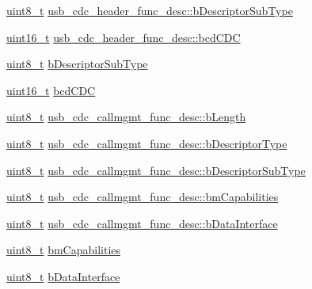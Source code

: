 \begin{DoxyCompactItemize}
\item 
\hyperlink{stdint_8h_aba7bc1797add20fe3efdf37ced1182c5}{uint8\-\_\-t} \hyperlink{group___p_i_o_s___u_s_b___d_e_f_s_ga9bdb88cd9eb6973d4b508010df9d45ff}{usb\-\_\-cdc\-\_\-header\-\_\-func\-\_\-desc\-::b\-Descriptor\-Sub\-Type}
\item 
\hyperlink{stdint_8h_a273cf69d639a59973b6019625df33e30}{uint16\-\_\-t} \hyperlink{group___p_i_o_s___u_s_b___d_e_f_s_gaedee5ac39032e71dd0837e37f480a398}{usb\-\_\-cdc\-\_\-header\-\_\-func\-\_\-desc\-::bcd\-C\-D\-C}
\item 
\hyperlink{stdint_8h_aba7bc1797add20fe3efdf37ced1182c5}{uint8\-\_\-t} \hyperlink{group___p_i_o_s___u_s_b___d_e_f_s_ga7569c561e3556e7df6b24aed1ff66f28}{b\-Descriptor\-Sub\-Type}
\item 
\hyperlink{stdint_8h_a273cf69d639a59973b6019625df33e30}{uint16\-\_\-t} \hyperlink{group___p_i_o_s___u_s_b___d_e_f_s_ga2bffb583550e4d83b4a2a4d735ece97f}{bcd\-C\-D\-C}
\item 
\hyperlink{stdint_8h_aba7bc1797add20fe3efdf37ced1182c5}{uint8\-\_\-t} \hyperlink{group___p_i_o_s___u_s_b___d_e_f_s_ga987115acb21ed11d7cf4255dc3224efb}{usb\-\_\-cdc\-\_\-callmgmt\-\_\-func\-\_\-desc\-::b\-Length}
\item 
\hyperlink{stdint_8h_aba7bc1797add20fe3efdf37ced1182c5}{uint8\-\_\-t} \hyperlink{group___p_i_o_s___u_s_b___d_e_f_s_gaeec8cc78a5f92025f5599a0f82a33b77}{usb\-\_\-cdc\-\_\-callmgmt\-\_\-func\-\_\-desc\-::b\-Descriptor\-Type}
\item 
\hyperlink{stdint_8h_aba7bc1797add20fe3efdf37ced1182c5}{uint8\-\_\-t} \hyperlink{group___p_i_o_s___u_s_b___d_e_f_s_ga7939fdf3f4d0475126d3b6055a11e7bb}{usb\-\_\-cdc\-\_\-callmgmt\-\_\-func\-\_\-desc\-::b\-Descriptor\-Sub\-Type}
\item 
\hyperlink{stdint_8h_aba7bc1797add20fe3efdf37ced1182c5}{uint8\-\_\-t} \hyperlink{group___p_i_o_s___u_s_b___d_e_f_s_ga48fbc5fa8369d703a7bdc6c51400cbeb}{usb\-\_\-cdc\-\_\-callmgmt\-\_\-func\-\_\-desc\-::bm\-Capabilities}
\item 
\hyperlink{stdint_8h_aba7bc1797add20fe3efdf37ced1182c5}{uint8\-\_\-t} \hyperlink{group___p_i_o_s___u_s_b___d_e_f_s_ga9b0af922aee941d19a36f9cc309e0094}{usb\-\_\-cdc\-\_\-callmgmt\-\_\-func\-\_\-desc\-::b\-Data\-Interface}
\item 
\hyperlink{stdint_8h_aba7bc1797add20fe3efdf37ced1182c5}{uint8\-\_\-t} \hyperlink{group___p_i_o_s___u_s_b___d_e_f_s_ga881b7a2d441c1074050bb06c058b680c}{bm\-Capabilities}
\item 
\hyperlink{stdint_8h_aba7bc1797add20fe3efdf37ced1182c5}{uint8\-\_\-t} \hyperlink{group___p_i_o_s___u_s_b___d_e_f_s_ga69219cd97dd6c69e7d5b798d9251ce5f}{b\-Data\-Interface}

\end{DoxyCompactItemize}
